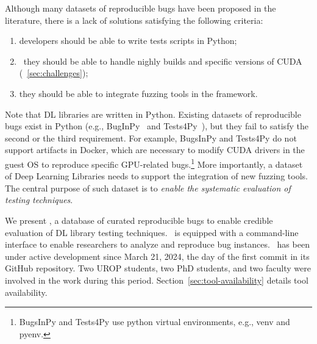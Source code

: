 \documentclass[sigconf,screen]{acmart}
\begin{document}
Although many datasets of reproducible bugs have been proposed in the
literature, there is a lack of solutions satisfying the following
criteria:

\begin{enumerate}[leftmargin=0.2in]
\item developers should be able to write tests scripts in Python;
\item ~they should be able to handle nighly builds and specific
  versions of CUDA (\textsection~\ref{sec:challenges});
\item they should be able to integrate fuzzing tools in the framework.
\end{enumerate}  

Note that DL libraries are written in Python. Existing datasets of
reproducible bugs exist in Python (e.g.,
BugInPy~\cite{widyasari2020bugsinpy} and
Tests4Py~\cite{smytzek2024tests4py}), but they fail to satisfy the
second or the third requirement. For example, BugsInPy and Tests4Py do
not support artifacts in Docker, which are necessary to modify CUDA
drivers in the guest OS to reproduce specific GPU-related
bugs.\footnote{BugsInPy and Tests4Py use python virtual environments,
e.g., venv and pyenv.} More importantly, a dataset of Deep Learning
Libraries needs to support the integration of new fuzzing tools. The
central purpose of such dataset is to \emph{enable the systematic
evaluation of testing techniques}.



We present \tname, a database of curated reproducible bugs to enable
credible evaluation of DL library testing techniques. \tname\ is
equipped with a command-line interface to enable researchers to
analyze and reproduce bug instances.  \tname\ has been under active
development since March 21, 2024, the day of the first commit in its
GitHub repository. Two UROP students, two PhD students, and two
faculty were involved in the work during this
period. Section~\ref{sec:tool-availability} details tool availability.
\end{document}
